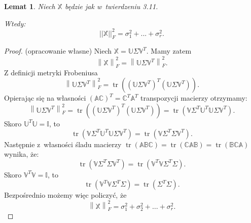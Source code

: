 \documentclass[12pt,a4paper]{report}
\newtheorem{lemat}[df]{Lemat}
\newcommand{\norma}[1]{\left\| {#1} \right\|}
\newcommand{\tr}[1]{\operatorname{tr}\left({#1} \right)}
\begin{document}
\begin{lemat}
Niech $\mathbb{X}$ będzie jak w~twierdzeniu 3.11.

Wtedy:
$$
||\mathbb{X}||_F^2 = \sigma_{1}^2+...+\sigma_{r}^2.
$$
\end{lemat}

\begin{proof}(opracowanie własne)
Niech $\mathbb{X}=\mathbb{U} \Sigma \mathbb{V}^T$.
Mamy zatem 
$$
\norma{ \mathbb{X}}_F^2 =
\norma{\mathbb{U} \Sigma \mathbb{V}^T}_F^2.
$$
Z definicji metryki Frobeniusa
$$
\norma{\mathbb{U} \Sigma \mathbb{V}^T}_F^2 = \tr{(\mathbb{U} \Sigma \mathbb{V}^T)^T (\mathbb{U} \Sigma \mathbb{V}^T)}.
$$
Opierając się na własności $(\mathbb{A}\mathbb{C})^T = \mathbb{C}^T \mathbb{A}^T$ transpozycji macierzy otrzymamy:
$$
\norma{\mathbb{U} \Sigma \mathbb{V}^T}_F^2 = \tr{(\mathbb{U} \Sigma \mathbb{V}^T)^T (\mathbb{U} \Sigma \mathbb{V}^T)} = \tr{\mathbb{V} \Sigma^T \mathbb{U}^T \mathbb{U} \Sigma \mathbb{V}^T}.
$$
Skoro $\mathbb{U}^T \mathbb{U} = \mathbb{I}$, to
$$
\tr{\mathbb{V} \Sigma^T \mathbb{U}^T \mathbb{U} \Sigma \mathbb{V}^T} = \tr{\mathbb{V} \Sigma ^T \Sigma \mathbb{V}^T}.
$$
Następnie z~własności śladu macierzy $\tr{\mathbb{A} \mathbb{B} \mathbb{C}}  = \tr{\mathbb{C} \mathbb{A} \mathbb{B}} = \tr{\mathbb{B} \mathbb{C} \mathbb{A}}$ wynika, że:
$$
\tr{\mathbb{V} \Sigma ^T \Sigma \mathbb{V}^T} = \tr{\mathbb{V}^T \mathbb{V} \Sigma^T \Sigma}.
$$
Skoro $\mathbb{V}^T \mathbb{V} = \mathbb{I}$, to
$$
\tr{\mathbb{V}^T \mathbb{V} \Sigma^T \Sigma} = \tr{\Sigma^T \Sigma}.
$$
Bezpośrednio możemy więc policzyć, że
$$
\norma{ \mathbb{X}}_F^2 = \sigma_{1}^2 + \sigma_{2}^2 + \ldots + \sigma_{r}^2.
$$
\end{proof}
\end{document}
